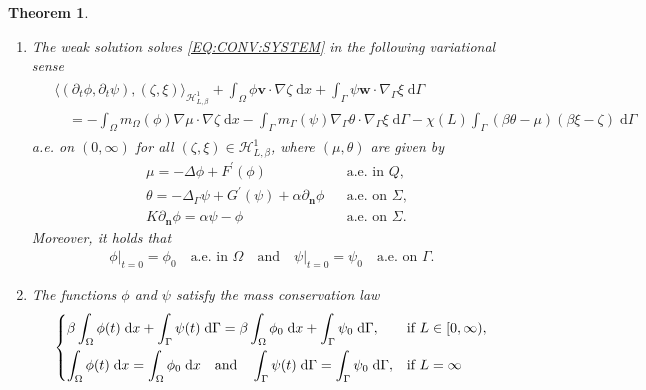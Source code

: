 \documentclass[10pt,reqno]{amsart}
\newtheorem{theorem}{Theorem}[section]
\theoremstyle{remark}
\numberwithin{equation}{section}
\newcommand{\abs}[1]{| #1 |}
\newcommand{\n}{\mathbf{n}}
\newcommand{\bv}{\mathbf{v}}
\newcommand{\bw}{\mathbf{w}}
\newcommand{\intO}{\int_\Omega}
\newcommand{\intG}{\int_\Gamma}
\newcommand{\dx}{\;\mathrm{d}x}
\newcommand{\dG}{\;\mathrm d\Ga}
\newcommand{\delt}{\partial_{t}}
\newcommand{\deln}{\partial_\n}
\newcommand{\Grad}{\nabla}
\newcommand{\Lap}{\Delta}
\newcommand{\Gradg}{\nabla_\Ga}
\newcommand{\Lapg}{\Delta_\Ga}
\newcommand{\Om}{\Omega}
\newcommand{\Ga}{\Gamma}
\begin{document}
\begin{theorem}
\begin{enumerate}[label=\textnormal{(\roman*)}, topsep=0ex, leftmargin=*, itemsep=1.5ex]
\begin{align}
            \abs{\phi} < 1 \quad\text{a.e.~in~}Q\quad\text{and} \quad\abs{\psi} < 1 \quad\text{a.e.~in~}\Sigma.
        \end{align}
        \item \label{CCH:WS:WeakForm} The weak solution solves \eqref{EQ:CONV:SYSTEM} in the following variational sense
        \begin{align}\label{WF:CCH:PP}
            \begin{split}
                &\big\langle (\delt\phi,\delt\psi), (\zeta,\xi)\big\rangle_{\mathcal{H}^1_{L,\beta}} + \intO \phi\bv\cdot\Grad\zeta\dx + \intG \psi\bw\cdot\Gradg\xi\dG \\
                &\quad = -\intO m_\Om(\phi)\Grad\mu\cdot\Grad\zeta\dx - \intG m_\Ga(\psi)\Gradg\theta\cdot\Gradg\xi\dG - \chi(L) \intG (\beta\theta - \mu)(\beta\xi - \zeta)\dG
            \end{split}
        \end{align}
        a.e. on $(0,\infty)$ for all $(\zeta,\xi)\in\mathcal{H}^1_{L,\beta}$, where $(\mu,\theta)$ are given by
        \begin{align}
            &\mu = -\Lap\phi + F^\prime(\phi) &&\text{a.e.~in } Q, \label{Eq:mu:strong}\\
            &\theta = -\Lapg\psi + G^\prime(\psi) + \alpha\deln\phi &&\text{a.e.~on } \Sigma, \label{Eq:theta:strong}\\
            &K\deln\phi = \alpha\psi - \phi &&  \text{a.e.~on } \Sigma.\label{Eq:bd:strong}
        \end{align}
        Moreover, it holds that
        \begin{align*}
            \phi\vert_{t=0} = \phi_0 \quad\text{a.e.~in~}\Om \quad\text{and}\quad\psi\vert_{t=0} = \psi_0 \quad\text{a.e.~on~}\Ga.
        \end{align*}
        \item \label{CCH:MCL} The functions $\phi$ and $\psi$ satisfy the mass conservation law
        \begin{align}\label{MCL:SING}
            \begin{dcases}
                \beta\intO \phi(t)\dx + \intG \psi(t)\dG = \beta\intO \phi_0 \dx + \intG \psi_0\dG, &\textnormal{if } L\in[0,\infty), \\
                \intO\phi(t)\dx = \intO\phi_0\dx \quad\textnormal{and}\quad \intG\psi(t)\dG = \intG\psi_0\dG, &\textnormal{if } L = \infty
            \end{dcases}
        \end{align}

\end{enumerate}
\end{theorem}
\end{document}
